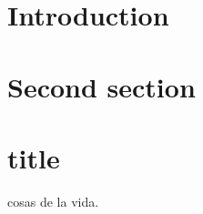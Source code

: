 


    \section{Introduction}
        
        
    \section{Second section}
        

    \section{title}
        cosas de la vida.
        


